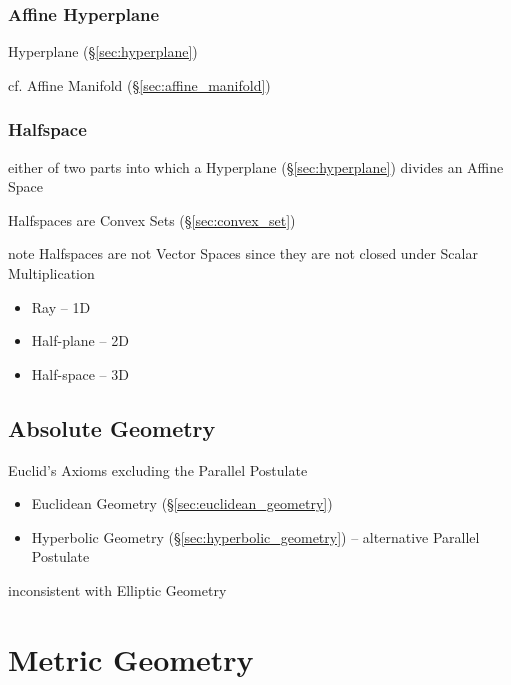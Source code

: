 \subsubsection{Affine Hyperplane}\label{sec:affine_hyperplane}

Hyperplane (\S\ref{sec:hyperplane})

cf. Affine Manifold (\S\ref{sec:affine_manifold})



\subsubsection{Halfspace}\label{sec:halfspace}

either of two parts into which a Hyperplane (\S\ref{sec:hyperplane}) divides an
Affine Space

Halfspaces are Convex Sets (\S\ref{sec:convex_set})

note Halfspaces are not Vector Spaces since they are not closed under Scalar
Multiplication

\begin{itemize}
  \item Ray -- 1D
  \item Half-plane -- 2D
  \item Half-space -- 3D
\end{itemize}



\subsection{Absolute Geometry}\label{sec:absolute_geometry}

Euclid's Axioms excluding the Parallel Postulate

\begin{itemize}
  \item Euclidean Geometry (\S\ref{sec:euclidean_geometry})
  \item Hyperbolic Geometry (\S\ref{sec:hyperbolic_geometry}) -- alternative
    Parallel Postulate
\end{itemize}

inconsistent with Elliptic Geometry



\section{Metric Geometry}\label{sec:metric_geometry}

